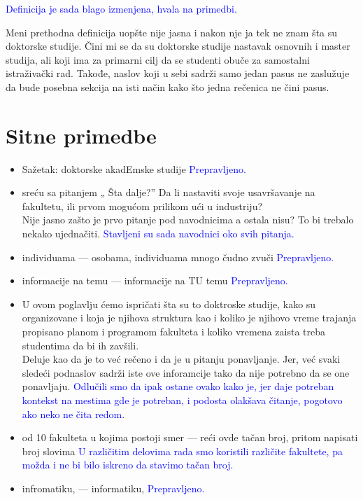 \documentclass[a4paper]{report}
\newcommand{\odgovor}[1]{\textcolor{blue}{#1}}
\begin{document}
\odgovor{Definicija je sada blago izmenjena, hvala na primedbi.}

Meni prethodna definicija uopšte nije jasna i nakon nje ja tek ne znam šta su doktorske studije. Čini mi se da su doktorske studije nastavak osnovnih i master studija, ali koji ima za primarni cilj da se studenti obuče za samostalni istraživački rad. Takođe, naslov koji u sebi sadrži samo jedan pasus ne zaslužuje da bude posebna sekcija na isti način kako što jedna rečenica ne čini pasus. 


\section{Sitne primedbe}
\begin{itemize}
\item Sažetak: doktorske akadEmske studije
\odgovor{Prepravljeno.}
\item sreću sa pitanjem „ Šta dalje?” Da li nastaviti svoje
usavršavanje na fakultetu, ili prvom mogućom prilikom ući u industriju? \\
Nije jasno zašto je prvo pitanje pod navodnicima a ostala nisu? To bi trebalo nekako ujednačiti. 
\odgovor{Stavljeni su sada navodnici oko svih pitanja.}
\item individuama --- osobama, individuama mnogo čudno zvuči
\odgovor{Prepravljeno.}
\item informacije na temu --- informacije na TU temu
\odgovor{Prepravljeno.}
\item U ovom poglavlju ćemo ispričati šta su to doktroske studije, kako su
organizovane i koja je njihova struktura kao i koliko je njihovo vreme
trajanja propisano planom i programom fakulteta i koliko vremena zaista
treba studentima da bi ih zavšili.\\
Deluje kao da je to već rečeno i da je u pitanju ponavljanje. Jer, već svaki sledeći podnaslov sadrži iste ove inforamcije tako da nije potrebno da se one ponavljaju. 
\odgovor{Odlučili smo da ipak ostane ovako kako je, jer daje potreban kontekst na mestima gde je potreban, i podosta olakšava čitanje, pogotovo ako neko ne čita redom.}
\item od 10 fakulteta u kojima postoji smer --- reći ovde tačan broj, pritom napisati broj slovima
\odgovor{U različitim delovima rada smo koristili različite fakultete, pa možda i ne bi bilo iskreno da stavimo tačan broj.}
\item infromatiku, --- informatiku,
\odgovor{Prepravljeno.}

\end{itemize}
\end{document}

